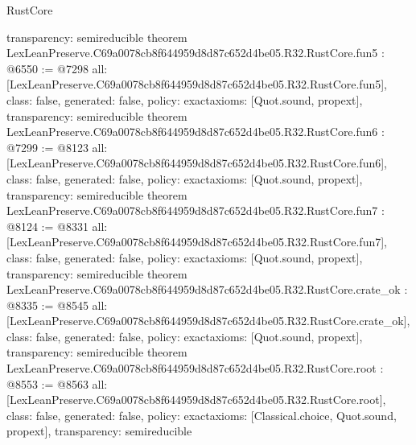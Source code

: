 \begin{lexlean}{RustCore}
\begin{coremodule}
{  transparency: semireducible
}
theorem LexLeanPreserve.C69a0078cb8f644959d8d87c652d4be05.R32.RustCore.fun5 : @6550 := @7298 {
  all: [LexLeanPreserve.C69a0078cb8f644959d8d87c652d4be05.R32.RustCore.fun5],
  class: false,
  generated: false,
  policy: exact{axioms: [Quot.sound, propext]},
  transparency: semireducible
}
theorem LexLeanPreserve.C69a0078cb8f644959d8d87c652d4be05.R32.RustCore.fun6 : @7299 := @8123 {
  all: [LexLeanPreserve.C69a0078cb8f644959d8d87c652d4be05.R32.RustCore.fun6],
  class: false,
  generated: false,
  policy: exact{axioms: [Quot.sound, propext]},
  transparency: semireducible
}
theorem LexLeanPreserve.C69a0078cb8f644959d8d87c652d4be05.R32.RustCore.fun7 : @8124 := @8331 {
  all: [LexLeanPreserve.C69a0078cb8f644959d8d87c652d4be05.R32.RustCore.fun7],
  class: false,
  generated: false,
  policy: exact{axioms: [Quot.sound, propext]},
  transparency: semireducible
}
theorem LexLeanPreserve.C69a0078cb8f644959d8d87c652d4be05.R32.RustCore.crate_ok : @8335 := @8545 {
  all: [LexLeanPreserve.C69a0078cb8f644959d8d87c652d4be05.R32.RustCore.crate_ok],
  class: false,
  generated: false,
  policy: exact{axioms: [Quot.sound, propext]},
  transparency: semireducible
}
theorem LexLeanPreserve.C69a0078cb8f644959d8d87c652d4be05.R32.RustCore.root : @8553 := @8563 {
  all: [LexLeanPreserve.C69a0078cb8f644959d8d87c652d4be05.R32.RustCore.root],
  class: false,
  generated: false,
  policy: exact{axioms: [Classical.choice, Quot.sound, propext]},
  transparency: semireducible
}


\end{coremodule}
\end{lexlean}

